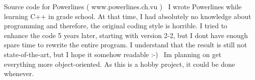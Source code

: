 Source code for Powerlines ( www.\+powerlines.\+ch.\+vu )~\newline
 I wrote Powerlines while learning C++ in grade school. At that time, I had absolutely no knowledge about programming and therefore, the original coding style is horrible. I tried to enhance the code 5 years later, starting with version 2-\/2, but I don\textquotesingle{}t have enough spare time to rewrite the entire program. I understand that the result is still not state-\/of-\/the-\/art, but I hope it somehow readable \+:-\/)~\newline
 I\textquotesingle{}m planning on get everything more object-\/oriented. As this is a hobby project, it could be done whenever. 